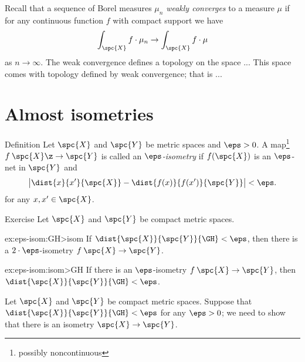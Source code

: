 Recall that a sequence of Borel measures $\mu_n$ \emph{weakly converges} to a measure $\mu$ if for any continuous function $f$ with compact support we have
\[\int_{\spc{X}} f\cdot \mu_n\to\int_{\spc{X}} f\cdot \mu\]
as $n\to \infty$.
The weak convergence defines a topology on the space ...
This space comes with topology defined by weak convergence;
that is ...

















\section{Almost isometries}\label{sec:alm-isom}

\begin{thm}{Definition} Let $\spc{X}$ and $\spc{Y}$ be metric spaces and $\eps>0$. 
A  map\footnote{possibly noncontinuous} $f\: \spc{X} \z\to \spc{Y}$ is called an \emph{$\eps$-isometry} 
if $f(\spc{X})$ is an $\eps$-net in $\spc{Y}$ and
\[\bigl|\dist{x}{x'}{\spc{X}}-\dist{f(x)}{f(x')}{\spc{Y}}\bigr|<\eps.\]
for any $x,x'\in \spc{X}$.
\end{thm}

\begin{thm}{Exercise}\label{ex:eps-isom}
Let $\spc{X}$ and $\spc{Y}$ be compact metric spaces.

\begin{subthm}{ex:eps-isom:GH>isom}
If $\dist{\spc{X}}{\spc{Y}}{\GH}<\eps$, then there is a $2\cdot\eps$-isometry $f\:\spc{X}\to\spc{Y}$.
\end{subthm}

\begin{subthm}{ex:eps-isom:isom>GH}
If there is an $\eps$-isometry $f\:\spc{X}\to\spc{Y}$, then $\dist{\spc{X}}{\spc{Y}}{\GH}<\eps$.
\end{subthm}

\end{thm}

\label{page:GH-2-proof}
Let $\spc{X}$ and $\spc{Y}$ be compact metric spaces.
Suppose that $\dist{\spc{X}}{\spc{Y}}{\GH}<\eps$ for any $\eps>0$;
we need to show that there is an isometry $\spc{X}\to\spc{Y}$.

